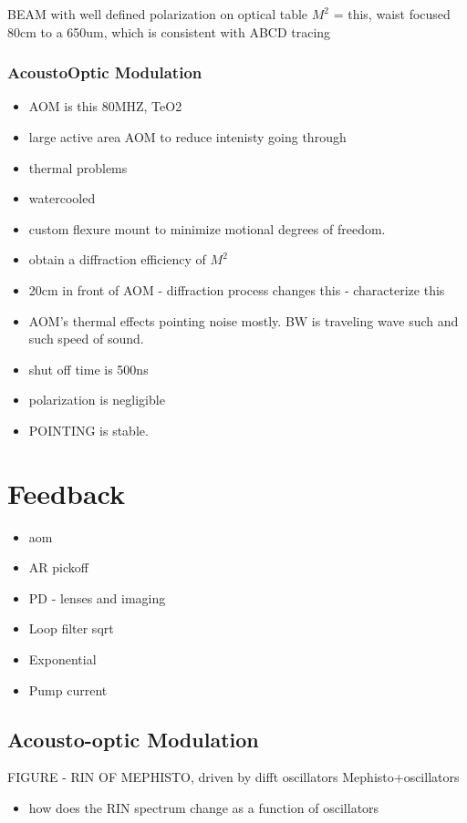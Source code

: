 \documentclass[twocolumn,aps,pra,showpacs,preprintnumbers,bibnotes]{revtex4-1}
\begin{document}
BEAM with well defined polarization on optical table 
$M^2$ = this, waist focused 80cm to a 650um, which is consistent with ABCD tracing

\subsubsection{AcoustoOptic Modulation}

\begin{itemize}
    \item AOM is this 80MHZ, TeO2
    \item large active area AOM to reduce intenisty going through
    \item thermal problems
    \item watercooled
    \item custom flexure mount to minimize motional degrees of freedom.
    \item obtain a diffraction efficiency of $M^2$
    \item 20cm in front of AOM - diffraction process changes this - characterize this
    \item AOM's thermal effects pointing noise mostly. BW is traveling wave such and such speed of sound.
    \item shut off time is 500ns
    \item polarization is negligible
    \item POINTING is stable.
\end{itemize}

\section{Feedback}
\begin{itemize}
    \item aom
    \item AR pickoff
    \item PD - lenses and imaging
    \item Loop filter sqrt
    \item Exponential
    \item Pump current
\end{itemize}


\subsection{Acousto-optic Modulation}

FIGURE - RIN OF MEPHISTO, driven by difft oscillators
Mephisto+oscillators
\begin{itemize}
	\item how does the RIN spectrum change as a function of oscillators
\end{itemize}
\end{document}
